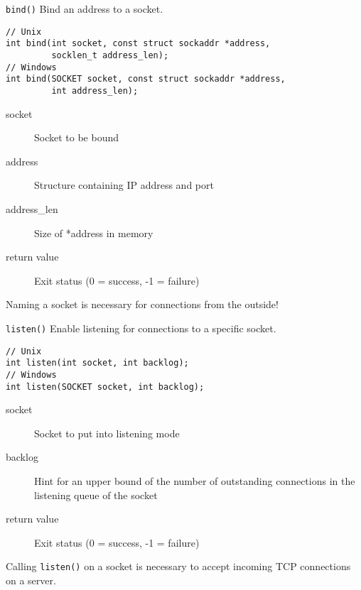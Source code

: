 \begin{frame}[fragile]{\texttt{bind()}}
    Bind an address to a socket.
    \begin{lstlisting}[numbers=none,morekeywords={*,SOCKET,socklen_t,sockaddr}]
// Unix
int bind(int socket, const struct sockaddr *address,
         socklen_t address_len);
// Windows
int bind(SOCKET socket, const struct sockaddr *address,
         int address_len);
\end{lstlisting}
    \begin{description}
        \item[socket] Socket to be bound
        \item[address] Structure containing IP address and port
        \item[address\_len] Size of *address in memory
        \item[return value] Exit status (0 = success, -1 = failure)
    \end{description}
    \bigskip
    Naming a socket is necessary for connections from the outside!
\end{frame}

\begin{frame}[fragile]{\texttt{listen()}}
    Enable listening for connections to a specific socket.
    \begin{lstlisting}[numbers=none,morekeywords={*,SOCKET}]
// Unix
int listen(int socket, int backlog);
// Windows
int listen(SOCKET socket, int backlog);
\end{lstlisting}
    \begin{description}
        \item[socket] Socket to put into listening mode
        \item[backlog] Hint for an upper bound of the number of outstanding
            connections in the listening queue of the socket
        \item[return value] Exit status (0 = success, -1 = failure)
    \end{description}
    \bigskip
    Calling \texttt{listen()} on a socket is necessary to accept incoming TCP
    connections on a server.
\end{frame}

